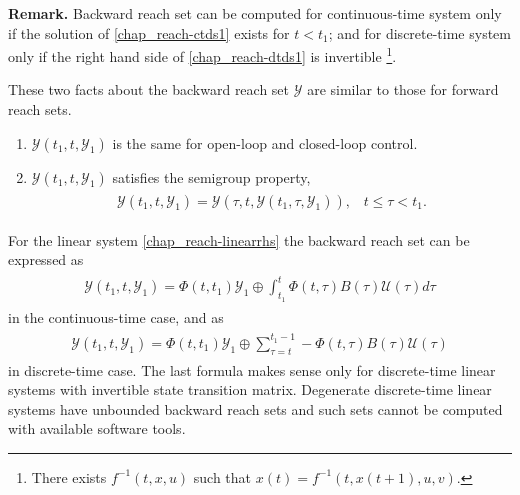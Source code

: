 \documentclass[letterpaper,10pt,english]{sphinxmanual}
\begin{document}
\textbf{Remark.} Backward reach set can be computed for continuous-time
system only if the solution of \eqref{chap_reach-ctds1} exists for \(t<t_1\); and
for discrete-time system only if the right hand side of \eqref{chap_reach-dtds1} is
invertible \footnote{
There exists \(f^{-1}(t,x,u)\) such that
\(x(t)=f^{-1}(t, x(t+1), u, v)\).
}.

These two facts about the backward reach set \({\mathcal Y}\) are
similar to those for forward reach sets.
\begin{enumerate}
\item {} 
\({\mathcal Y}(t_1, t, {\mathcal Y}_1)\) is the same for
open-loop and closed-loop control.

\item {} 
\({\mathcal Y}(t_1, t, {\mathcal Y}_1)\) satisfies the semigroup
property,
\label{chap_reach:equation-semigroup_b}\begin{gather}
\begin{split}{\mathcal Y}(t_1, t, {\mathcal Y}_1) = {\mathcal Y}(\tau, t, {\mathcal Y}(t_1, \tau, {\mathcal Y}_1)), \;\;\;
t\leqslant\tau< t_1.\end{split}\label{chap_reach-semigroup_b}
\end{gather}
\end{enumerate}

For the linear system \eqref{chap_reach-linearrhs} the backward reach set can be
expressed as
\label{chap_reach:equation-ctlsbrs}\begin{gather}
\begin{split}{\mathcal Y}(t_1, t, {\mathcal Y}_1) =
\Phi(t, t_1){\mathcal Y}_1 \oplus \int_{t_1}^t\Phi(t, \tau)B(\tau){\mathcal U}(\tau)d\tau\end{split}\label{chap_reach-ctlsbrs}
\end{gather}
in the continuous-time case, and as
\label{chap_reach:equation-dtlsbrs}\begin{gather}
\begin{split}{\mathcal Y}(t_1, t, {\mathcal Y}_1) =
\Phi(t, t_1){\mathcal Y}_1 \oplus \sum_{\tau =t}^{t_1-1}-\Phi(t, \tau)B(\tau){\mathcal U}(\tau)\end{split}\label{chap_reach-dtlsbrs}
\end{gather}
in discrete-time case. The last formula makes sense only for
discrete-time linear systems with invertible state transition matrix.
Degenerate discrete-time linear systems have unbounded backward reach
sets and such sets cannot be computed with available software tools.
\end{document}
